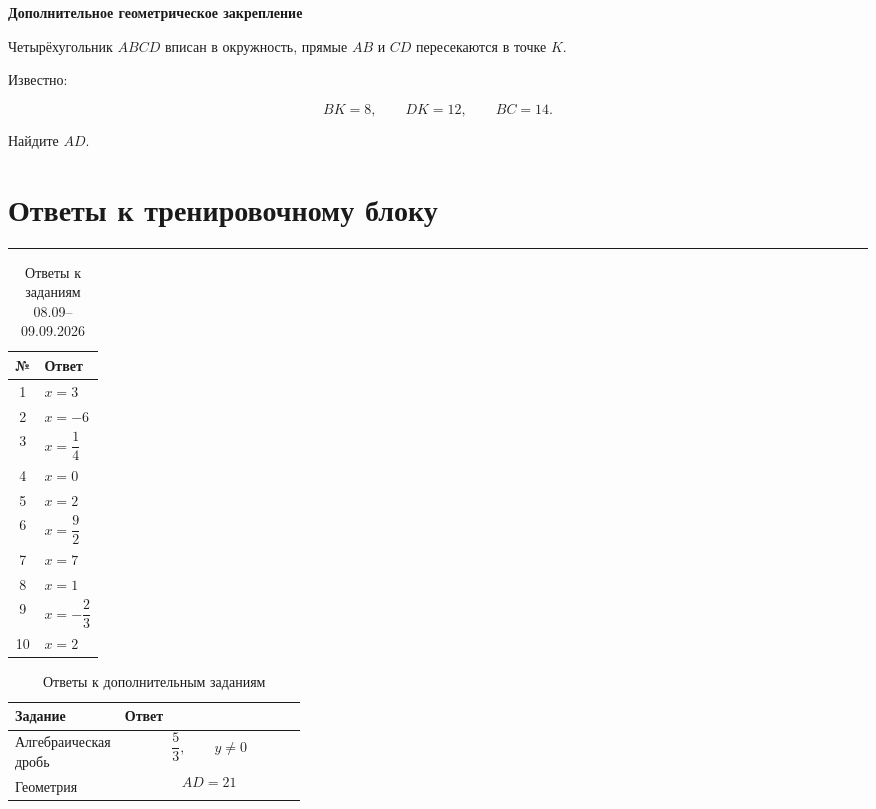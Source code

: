 \documentclass[a4paper,12pt]{article}
\newcommand{\sectionline}{\par\vspace{0.15em}\noindent\textcolor{accent}{\rule{\linewidth}{0.7pt}}\par\vspace{0.2em}}
\begin{document}
\vspace{0.7em}

\textbf{Дополнительное геометрическое закрепление}

Четырёхугольник \(ABCD\) вписан в окружность, прямые \(AB\) и \(CD\) пересекаются в точке \(K\).

Известно:

\[
BK=8,
\qquad
DK=12,
\qquad
BC=14.
\]

Найдите \(AD\).


\clearpage

\section*{Ответы к тренировочному блоку}
\sectionline

\begin{table}[ht]
\centering
\caption{Ответы к заданиям 08.09--09.09.2026}

\begin{tabularx}{\linewidth}{@{}cX@{}}
\toprule
\textbf{№} & \textbf{Ответ} \\
\midrule

1 & \(x=3\) \\

2 & \(x=-6\) \\

3 & \(x=\dfrac14\) \\

4 & \(x=0\) \\

5 & \(x=2\) \\

6 & \(x=\dfrac92\) \\

7 & \(x=7\) \\

8 & \(x=1\) \\

9 & \(x=-\dfrac23\) \\

10 & \(x=2\) \\

\bottomrule
\end{tabularx}
\end{table}

\vspace{1em}

\begin{table}[ht]
\centering
\caption{Ответы к дополнительным заданиям}

\begin{tabularx}{\linewidth}{@{}p{0.34\linewidth}X@{}}
\toprule
\textbf{Задание} & \textbf{Ответ} \\
\midrule

Алгебраическая дробь &
\[
\frac53,
\qquad
y\ne0
\]
\\

Геометрия &
\[
AD=21
\]
\\

\bottomrule
\end{tabularx}
\end{table}
\end{document}
